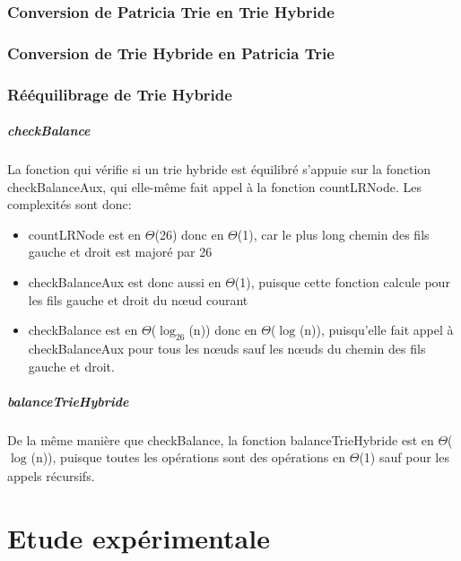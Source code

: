 \documentclass[a4paper,12pt]{report}
\begin{document}
\subsection{Conversion de Patricia Trie en Trie Hybride}

\subsection{Conversion de Trie Hybride en Patricia Trie}

\subsection{Rééquilibrage de Trie Hybride}
\paragraph{checkBalance}
La fonction qui vérifie si un trie hybride est équilibré s'appuie sur la fonction checkBalanceAux, qui elle-même fait appel à la fonction countLRNode.
Les complexités sont donc:
\begin{itemize}
 \item countLRNode est en $\Theta$(26) donc en $\Theta$(1), car le plus long chemin des fils gauche et droit est majoré par 26
 \item checkBalanceAux est donc aussi en $\Theta$(1), puisque cette fonction calcule pour les fils gauche et droit du nœud courant
 \item checkBalance est en $\Theta$($\log_{26}$(n)) donc en $\Theta$($\log_{}$(n)), puisqu'elle fait appel à checkBalanceAux 
pour tous les nœuds sauf les nœuds du chemin des fils gauche et droit.
\end{itemize}

\paragraph{balanceTrieHybride}
De la même manière que checkBalance, la fonction balanceTrieHybride est en $\Theta$($\log_{}$(n)), puisque toutes les opérations
sont des opérations en $\Theta$(1) sauf pour les appels récursifs.

\chapter{Etude expérimentale}
\end{document}
